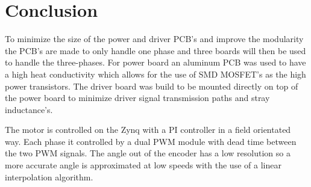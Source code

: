 \section{Conclusion}
\label{sec:conclusion}


To minimize the size of the power and driver PCB's and improve the modularity the PCB's are made to only handle one phase and three boards will then be used to handle the three-phases.
For power board an aluminum PCB was used to have a high heat conductivity which allows for the use of SMD MOSFET's as the high power transistors. The driver board was build to be mounted directly on top of the power board to minimize driver signal transmission paths and stray inductance's.

The motor is controlled on the Zynq with a PI controller in a field orientated way. Each phase it controlled by a dual PWM module with dead time between the two PWM signals.
The angle out of the encoder has a low resolution so a more accurate angle is approximated at low speeds with the use of a linear interpolation algorithm. 

